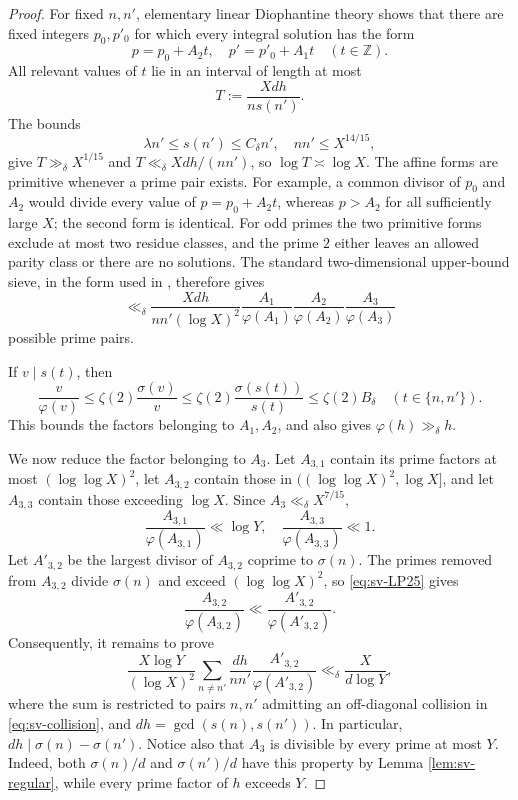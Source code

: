 \documentclass[11pt,letterpaper,reqno]{amsart}
\numberwithin{equation}{section}
\theoremstyle{remark}
\newcommand{\Z}{\mathbb{Z}}
\newcommand{\1}{\mathbf 1}
\renewcommand{\leq}{\leqslant}
\begin{document}
\begin{proof}
For fixed $n,n'$, elementary linear Diophantine theory shows that there
are fixed integers $p_0,p'_0$ for which every integral solution has the form
\[
 p=p_0+A_2t,\quad p'=p'_0+A_1t \quad(t\in\Z).
\]
All relevant values of $t$ lie in an interval of length at most
\[
 T:=\frac{Xdh}{n s(n')}.
\]
The bounds
\[
 \lambda n'\leq s(n')\leq C_\delta n',
 \quad nn'\leq X^{14/15},
\]
give $T\gg_\delta X^{1/15}$ and
$T\ll_\delta Xdh/(nn')$, so $\log T\asymp\log X$. The affine forms are
primitive whenever a prime pair exists. For example, a common divisor of
$p_0$ and $A_2$ would divide every value of $p=p_0+A_2t$, whereas
$p>A_2$ for all sufficiently large $X$; the second form is identical.
For odd primes the two primitive forms exclude at most two residue classes,
and the prime $2$ either leaves an allowed parity class or there are no
solutions. The standard two-dimensional upper-bound sieve, in the form used in
\cite[(3.7)]{LucaPomerance}, therefore gives
\[
 \ll_\delta
 \frac{Xdh}{nn'(\log X)^2}
 \frac{A_1}{\varphi(A_1)}
 \frac{A_2}{\varphi(A_2)}
 \frac{A_3}{\varphi(A_3)}
\]
possible prime pairs.

If $v\mid s(t)$, then
\begin{equation}\label{eq:sv-totient}
 \frac v{\varphi(v)}
 \leq\zeta(2)\frac{\sigma(v)}v
 \leq\zeta(2)\frac{\sigma(s(t))}{s(t)}
 \leq\zeta(2)B_\delta
 \quad(t\in\{n,n'\}).
\end{equation}
This bounds the factors belonging to $A_1,A_2$, and also gives
$\varphi(h)\gg_\delta h$.

We now reduce the factor belonging to $A_3$. Let $A_{3,1}$ contain its
prime factors at most $(\log\log X)^2$, let $A_{3,2}$ contain those in
$((\log\log X)^2,\log X]$, and let $A_{3,3}$ contain those exceeding
$\log X$. Since $A_3\ll_\delta X^{7/15}$,
\[
 \frac{A_{3,1}}{\varphi(A_{3,1})}\ll\log Y,
 \quad
 \frac{A_{3,3}}{\varphi(A_{3,3})}\ll1.
\]
Let $A'_{3,2}$ be the largest divisor of $A_{3,2}$ coprime to
$\sigma(n)$. The primes removed from $A_{3,2}$ divide $\sigma(n)$ and
exceed $(\log\log X)^2$, so \eqref{eq:sv-LP25} gives
\[
 \frac{A_{3,2}}{\varphi(A_{3,2})}
 \ll\frac{A'_{3,2}}{\varphi(A'_{3,2})}.
\]
Consequently, it remains to prove
\begin{equation}\label{eq:sv-reduced-collision-sum}
 \frac{X\log Y}{(\log X)^2}
 \sum_{n\ne n'}
 \frac{dh}{nn'}
 \frac{A'_{3,2}}{\varphi(A'_{3,2})}
 \ll_\delta\frac{X}{d\log Y},
\end{equation}
where the sum is restricted to pairs $n,n'$ admitting an off-diagonal
collision in \eqref{eq:sv-collision}, and $dh=\gcd(s(n),s(n'))$.
In particular, $dh\mid\sigma(n)-\sigma(n')$.
Notice also that $A_3$ is divisible by every
prime at most $Y$. Indeed, both $\sigma(n)/d$ and $\sigma(n')/d$ have this
property by Lemma \ref{lem:sv-regular}, while every prime factor of $h$
exceeds $Y$.


\end{proof}
\end{document}
